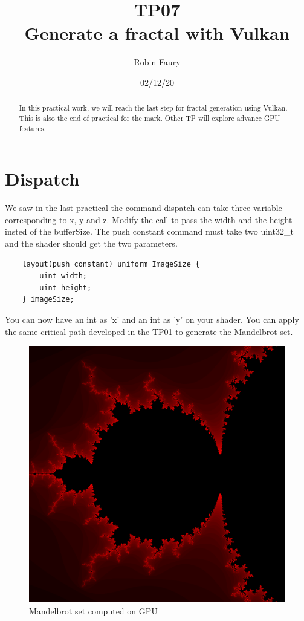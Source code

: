 \documentclass{article}
\begin{document}
\title{TP07\\Generate a fractal with Vulkan}
\author{Robin Faury}
\date{02/12/20}
\maketitle

\begin{abstract}
	In this practical work, we will reach the last step for fractal generation using Vulkan. This is also the end of practical for the mark. Other TP will explore advance GPU features.
\end{abstract}

\section{Dispatch}
We saw in the last practical the command dispatch can take three variable corresponding to x, y and z. Modify the call to pass the width and the height insted of the bufferSize. The push constant command must take two uint32\_t and the shader should get the two parameters.

\begin{lstlisting}
	layout(push_constant) uniform ImageSize {
		uint width;
		uint height;
	} imageSize;
\end{lstlisting}

You can now have an int as 'x' and an int as 'y' on your shader. You can apply the same critical path developed in the TP01 to generate the Mandelbrot set.

\begin{figure}[H]
	\centering
	\includegraphics[scale=0.2]{figures/Mandelbrot.png}
	\caption{Mandelbrot set computed on GPU}
\end{figure}
\end{document}
